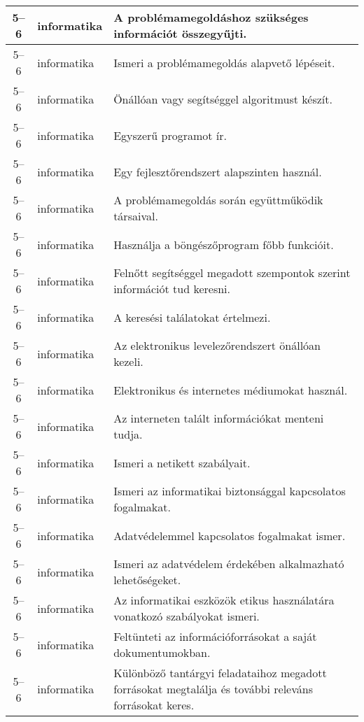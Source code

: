 \begin{small}
\begin{longtable}{c | p{2cm} |  p{11cm} }
              5--6 & informatika & A problémamegoldáshoz szükséges információt összegyűjti. \\ \hline
              5--6 & informatika & Ismeri a problémamegoldás alapvető lépéseit. \\ \hline
              5--6 & informatika & Önállóan vagy segítséggel algoritmust készít. \\ \hline
              5--6 & informatika & Egyszerű programot ír. \\ \hline
              5--6 & informatika & Egy fejlesztőrendszert alapszinten használ. \\ \hline
              5--6 & informatika & A problémamegoldás során együttműködik társaival. \\ \hline
              5--6 & informatika & Használja a böngészőprogram főbb funkcióit. \\ \hline
              5--6 & informatika & Felnőtt segítséggel megadott szempontok szerint információt tud keresni. \\ \hline
              5--6 & informatika & A keresési találatokat értelmezi. \\ \hline
              5--6 & informatika & Az elektronikus levelezőrendszert önállóan kezeli. \\ \hline
              5--6 & informatika & Elektronikus és internetes médiumokat használ. \\ \hline
              5--6 & informatika & Az interneten talált információkat menteni tudja. \\ \hline
              5--6 & informatika & Ismeri a netikett szabályait. \\ \hline
              5--6 & informatika & Ismeri az informatikai biztonsággal kapcsolatos fogalmakat. \\ \hline
              5--6 & informatika & Adatvédelemmel kapcsolatos fogalmakat ismer. \\ \hline
              5--6 & informatika & Ismeri az adatvédelem érdekében alkalmazható lehetőségeket. \\ \hline
              5--6 & informatika & Az informatikai eszközök etikus használatára vonatkozó szabályokat ismeri. \\ \hline
              5--6 & informatika & Feltünteti az információforrásokat a saját dokumentumokban. \\ \hline
              5--6 & informatika & Különböző tantárgyi feladataihoz megadott forrásokat megtalálja és további releváns forrásokat keres. \\ \hline

\end{longtable}
\end{small}
